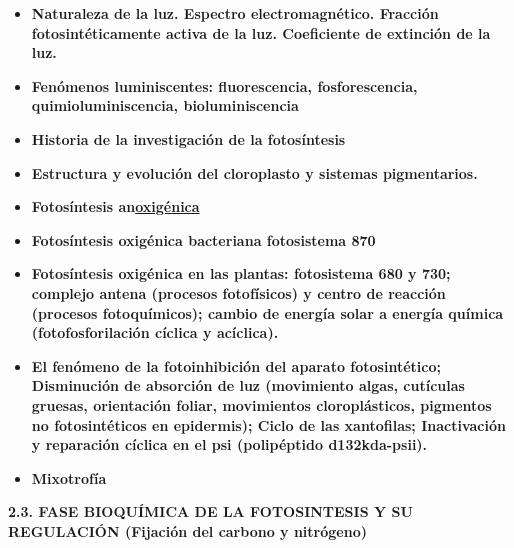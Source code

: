 \documentclass[
]{article}
\begin{document}
\begin{itemize}
\item
  \textbf{Naturaleza de la luz. Espectro electromagnético. Fracción
  fotosintéticamente activa de la luz. Coeficiente de extinción de la
  luz.}
\item
  \textbf{Fenómenos luminiscentes: fluorescencia, fosforescencia,
  quimioluminiscencia, bioluminiscencia}
\item
  \textbf{Historia de la investigación de la fotosíntesis}
\item
  \textbf{Estructura y evolución del cloroplasto y sistemas
  pigmentarios.}
\item
  \textbf{Fotosíntesis an\uline{oxigénica}}
\item
  \textbf{Fotosíntesis oxigénica bacteriana fotosistema 870}
\item
  \textbf{Fotosíntesis oxigénica en las plantas: fotosistema 680 y 730;
  complejo antena (procesos fotofísicos) y centro de reacción (procesos
  fotoquímicos); cambio de energía solar a energía química
  (fotofosforilación cíclica y acíclica).}
\item
  \textbf{El fenómeno de la fotoinhibición del aparato fotosintético;
  Disminución de absorción de luz (movimiento algas, cutículas gruesas,
  orientación foliar, movimientos cloroplásticos, pigmentos no
  fotosintéticos en epidermis); Ciclo de las xantofilas; Inactivación y
  reparación cíclica en el psi (polipéptido d132kda-psii).}
\item
  \textbf{Mixotrofía}
\end{itemize}

\textbf{2.3. FASE BIOQUÍMICA DE LA FOTOSINTESIS Y SU REGULACIÓN
(Fijación del carbono y nitrógeno)}
\end{document}
